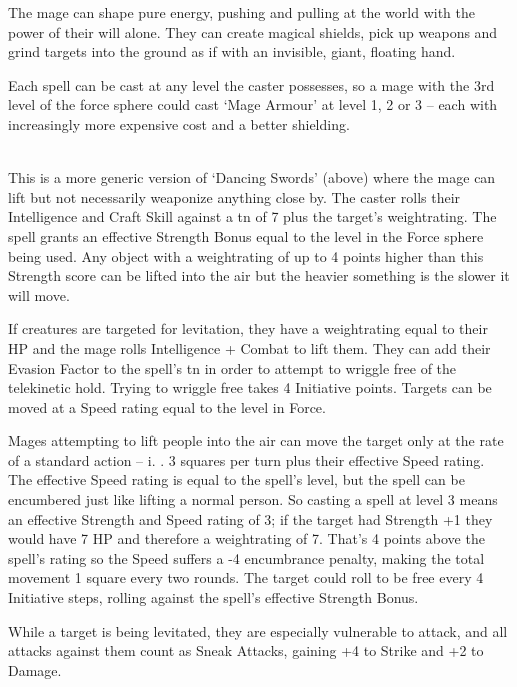\begin{multicols}{2}

\noindent
The mage can shape pure energy, pushing and pulling at the world with the power of their will alone. They can create magical shields, pick up weapons and grind targets into the ground as if with an invisible, giant, floating hand.

Each spell can be cast at any level the caster possesses, so a mage with the 3rd level of the force sphere could cast `Mage Armour' at level 1, 2 or 3 -- each with increasingly more expensive cost and a better shielding.

\spelllevel

\\
This is a more generic version of `Dancing Swords' (above) where the mage can lift but not necessarily weaponize anything close by.
The caster rolls their Intelligence and Craft Skill against a \gls{tn} of 7 plus the target's \gls{weightrating}.
The spell grants an effective Strength Bonus equal to the level in the Force sphere being used.
Any object with a \gls{weightrating} of up to 4 points higher than this Strength score can be lifted into the air but the heavier something is the slower it will move.

If creatures are targeted for levitation, they have a \gls{weightrating} equal to their HP and the mage rolls Intelligence + Combat to lift them.
They can add their Evasion Factor to the spell's \gls{tn} in order to attempt to wriggle free of the telekinetic hold.
Trying to wriggle free takes 4 Initiative points.
Targets can be moved at a Speed rating equal to the level in Force.

Mages attempting to lift people into the air can move the target only at the rate of a standard action -- i.
. 3 squares per turn plus their effective Speed rating.
The effective Speed rating is equal to the spell's level, but the spell can be encumbered just like lifting a normal person.
So casting a spell at level 3 means an effective Strength and Speed rating of 3; if the target had Strength +1 they would have 7 HP and therefore a \gls{weightrating} of 7.
That's 4 points above the spell's rating so the Speed suffers a -4 encumbrance penalty, making the total movement 1 square every two \glspl{round}.
The target could roll to be free every 4 Initiative steps, rolling against the spell's effective Strength Bonus.

While a target is being levitated, they are especially vulnerable to attack, and all attacks against them count as Sneak Attacks, gaining +4 to Strike and +2 to Damage.


\end{multicols}
